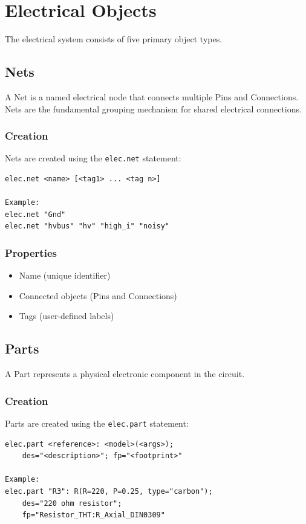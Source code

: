 \chapter{Electrical Objects}
The electrical system consists of five primary object types.

\section{Nets}
A Net is a named electrical node that connects multiple Pins and Connections. Nets are the fundamental grouping mechanism for shared electrical connections.

\subsection{Creation}
Nets are created using the \texttt{elec.net} statement:
\begin{verbatim}
elec.net <name> [<tag1> ... <tag n>]

Example:
elec.net "Gnd"
elec.net "hvbus" "hv" "high_i" "noisy"
\end{verbatim}

\subsection{Properties}
\begin{itemize}
\item Name (unique identifier)
\item Connected objects (Pins and Connections)
\item Tags (user-defined labels)
\end{itemize}

\section{Parts}
A Part represents a physical electronic component in the circuit.

\subsection{Creation}
Parts are created using the \texttt{elec.part} statement:
\begin{verbatim}
elec.part <reference>: <model>(<args>); 
    des="<description>"; fp="<footprint>"

Example:
elec.part "R3": R(R=220, P=0.25, type="carbon"); 
    des="220 ohm resistor"; 
    fp="Resistor_THT:R_Axial_DIN0309"
\end{verbatim}

